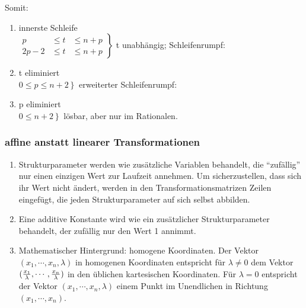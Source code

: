 Somit:
\begin{enumerate}
\item innerste Schleife\\
    $\left.
    \begin{array}{ccc}
      p    & \leq t & \leq n+p \\
      2p-2 & \leq t & \leq n+p
    \end{array}
    \right\}$ t unabhängig; Schleifenrumpf:
    \begin{procedure}[ht]
    \end{procedure}

\item t eliminiert\\
    $\left.
    0 \leq p \leq n+2
    \right\}$ erweiterter Schleifenrumpf:
    \begin{procedure}[ht]
       {
      }
    \end{procedure}

\item p eliminiert\\
    $\left. 0 \leq n+2 \right\}$ lösbar, aber nur im Rationalen.
\end{enumerate}


\subsubsection{affine anstatt linearer Transformationen}
\begin{enumerate}
\item Strukturparameter werden wie zusätzliche Variablen behandelt, die ``zufällig'' nur einen einzigen Wert zur Laufzeit annehmen.
	Um sicherzustellen, dass sich ihr Wert nicht ändert, werden in den Transformationsmatrizen Zeilen eingefügt, die jeden Strukturparameter auf sich selbst abbilden.
\item Eine additive Konstante wird wie ein zusätzlicher Strukturparameter behandelt, der zufällig nur den Wert 1 annimmt.
\item Mathematischer Hintergrund: homogene Koordinaten.
	Der Vektor $(x_1,\cdots,x_n,\lambda)$ in homogenen Koordinaten entspricht für $\lambda\not=0$ dem Vektor $({x_1\over \lambda},\cdots,{x_n\over \lambda})$ in den üblichen kartesischen Koordinaten. Für $\lambda=0$ entspricht der Vektor $(x_1,\cdots,x_n,\lambda)$ einem Punkt im Unendlichen in Richtung $(x_1,\cdots,x_n)$.
\end{enumerate}